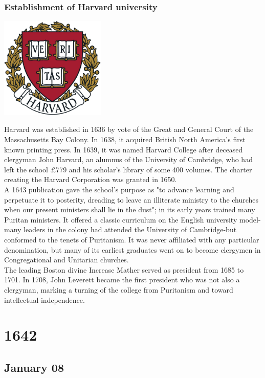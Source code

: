 \documentclass[11pt]{report}
\begin{document}
\subsection{Establishment of Harvard university}
\vspace{2mm}\begin{center}\includegraphics[width=5cm]{./img/harvardLogo.jpg}\end{center}
Harvard was established in 1636 by vote of the Great and General Court of the Massachusetts Bay Colony. In 1638, it acquired British North America's first known printing press. In 1639, it was named Harvard College after deceased clergyman John Harvard, an alumnus of the University of Cambridge, who had left the school £779 and his scholar's library of some 400 volumes. The charter creating the Harvard Corporation was granted in 1650.\\
A 1643 publication gave the school's purpose as "to advance learning and perpetuate it to posterity, dreading to leave an illiterate ministry to the churches when our present ministers shall lie in the dust"; in its early years trained many Puritan ministers. It offered a classic curriculum on the English university model-many leaders in the colony had attended the University of Cambridge-but conformed to the tenets of Puritanism. It was never affiliated with any particular denomination, but many of its earliest graduates went on to become clergymen in Congregational and Unitarian churches.\\
The leading Boston divine Increase Mather served as president from 1685 to 1701. In 1708, John Leverett became the first president who was not also a clergyman, marking a turning of the college from Puritanism and toward intellectual independence.

\chapter{1642}
\section{January 08}
\end{document}
